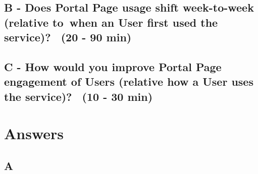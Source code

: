 \documentclass[11pt]{article}
\begin{document}
\hypertarget{b---does-portal-page-usage-shift-week-to-week-relative-towhen-an-user-first-used-the-service-20---90-min}{%
\subsection{B - Does Portal Page usage shift week-to-week (relative
to~when an User first used the service)? ~(20 - 90
min)}\label{b---does-portal-page-usage-shift-week-to-week-relative-towhen-an-user-first-used-the-service-20---90-min}}

\hypertarget{c---how-would-you-improve-portal-page-engagement-of-users-relative-how-a-user-uses-the-service-10---30-min}{%
\subsection{C - How would you improve Portal Page engagement of Users
(relative how a User uses the service)? ~(10 - 30
min)}\label{c---how-would-you-improve-portal-page-engagement-of-users-relative-how-a-user-uses-the-service-10---30-min}}

\hypertarget{answers}{%
\section{Answers}\label{answers}}

\hypertarget{a}{%
\subsection{A}\label{a}}
\end{document}
